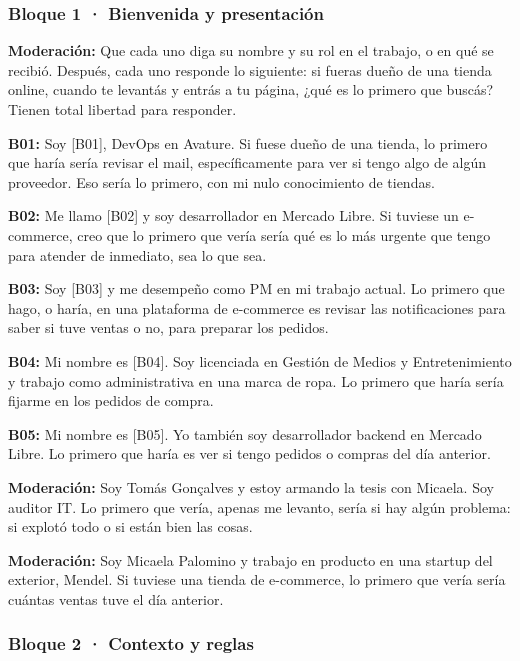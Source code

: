 \subsubsection*{Bloque 1 · Bienvenida y presentación}

\noindent\textbf{Moderación:} Que cada uno diga su nombre y su rol en el trabajo, o en qué se recibió. Después, cada uno responde lo siguiente: si fueras dueño de una tienda online, cuando te levantás y entrás a tu página, ¿qué es lo primero que buscás? Tienen total libertad para responder.

\noindent\textbf{B01:} Soy [B01], DevOps en Avature. Si fuese dueño de una tienda, lo primero que haría sería revisar el mail, específicamente para ver si tengo algo de algún proveedor. Eso sería lo primero, con mi nulo conocimiento de tiendas.

\noindent\textbf{B02:} Me llamo [B02] y soy desarrollador en Mercado Libre. Si tuviese un e-commerce, creo que lo primero que vería sería qué es lo más urgente que tengo para atender de inmediato, sea lo que sea.

\noindent\textbf{B03:} Soy [B03] y me desempeño como PM en mi trabajo actual. Lo primero que hago, o haría, en una plataforma de e-commerce es revisar las notificaciones para saber si tuve ventas o no, para preparar los pedidos.

\noindent\textbf{B04:} Mi nombre es [B04]. Soy licenciada en Gestión de Medios y Entretenimiento y trabajo como administrativa en una marca de ropa. Lo primero que haría sería fijarme en los pedidos de compra.

\noindent\textbf{B05:} Mi nombre es [B05]. Yo también soy desarrollador backend en Mercado Libre. Lo primero que haría es ver si tengo pedidos o compras del día anterior.

\noindent\textbf{Moderación:} Soy Tomás Gonçalves y estoy armando la tesis con Micaela. Soy auditor IT. Lo primero que vería, apenas me levanto, sería si hay algún problema: si explotó todo o si están bien las cosas.

\noindent\textbf{Moderación:} Soy Micaela Palomino y trabajo en producto en una startup del exterior, Mendel. Si tuviese una tienda de e-commerce, lo primero que vería sería cuántas ventas tuve el día anterior.

\subsubsection*{Bloque 2 · Contexto y reglas}

